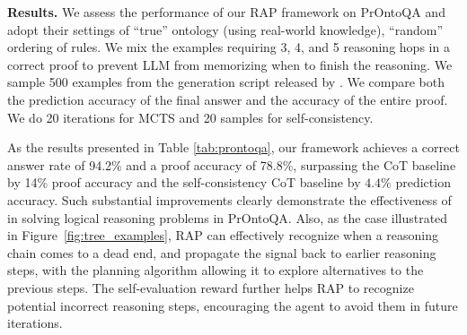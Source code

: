 \noindent \textbf{Results.}
We assess the performance of our RAP framework on PrOntoQA \cite{saparov2022language} and adopt their settings of ``true'' ontology (using real-world knowledge), ``random'' ordering of rules. We mix the examples requiring 3, 4, and 5 reasoning hops in a correct proof to prevent LLM from memorizing when to finish the reasoning. We sample 500 examples from the generation script released by \citet{saparov2022language}.
We compare both the prediction accuracy of the final answer and the accuracy of the entire proof.
We do 20 iterations for MCTS and 20 samples for self-consistency.

As the results presented in Table \ref{tab:prontoqa}, our framework achieves a correct answer rate of 94.2\% and a proof accuracy of 78.8\%, surpassing the CoT baseline by 14\% proof accuracy and the self-consistency CoT baseline by $4.4\%$ prediction accuracy. Such substantial improvements clearly demonstrate the effectiveness of \ours in solving logical reasoning problems in PrOntoQA. Also, as the case illustrated in Figure~\ref{fig:tree_examples}, RAP can effectively recognize when a reasoning chain comes to a dead end, and propagate the signal back to earlier reasoning steps, with the planning algorithm allowing it to explore alternatives to the previous steps. The self-evaluation reward further helps RAP to recognize potential incorrect reasoning steps, encouraging the agent to avoid them in future iterations.

